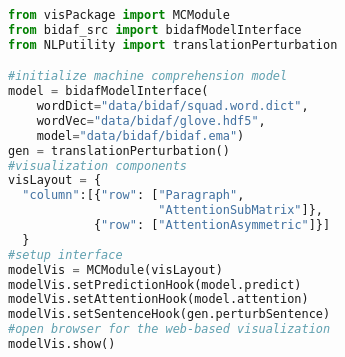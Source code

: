 \begin{lstlisting}[language=Python, caption=Code for setting up the visualization system shown in the paper.]
from visPackage import MCModule
from bidaf_src import bidafModelInterface
from NLPutility import translationPerturbation

#initialize machine comprehension model
model = bidafModelInterface(
    wordDict="data/bidaf/squad.word.dict",
    wordVec="data/bidaf/glove.hdf5",
    model="data/bidaf/bidaf.ema")
gen = translationPerturbation()
#visualization components
visLayout = {
  "column":[{"row": ["Paragraph", 
                     "AttentionSubMatrix"]},
            {"row": ["AttentionAsymmetric"]}]
  }
#setup interface
modelVis = MCModule(visLayout)
modelVis.setPredictionHook(model.predict)
modelVis.setAttentionHook(model.attention)
modelVis.setSentenceHook(gen.perturbSentence)
#open browser for the web-based visualization
modelVis.show()
\end{lstlisting}





